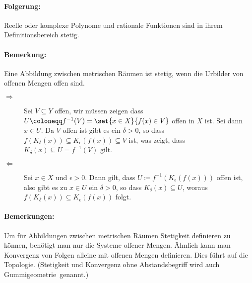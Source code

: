 \paragraph{Folgerung:}
Reelle oder komplexe Polynome und rationale Funktionen sind in ihrem Definitionsbereich stetig.
\paragraph{Bemerkung:}
Eine Abbildung zwischen metrischen Räumen ist stetig, wenn die Urbilder von offenen Mengen offen sind.
\beweis
\begin{description}
	\item[\glqq$\Rightarrow$\grqq] Sei $V\subseteq Y$ offen, wir müssen zeigen dass
	$U\coloneqq f^{-1}(V) =\set{x\in X}{f(x)\in V}$ offen in $X$ ist.
	Sei dann $x\in U$. Da $V$ offen ist gibt es ein $\delta>0$, so dass $f(K_\delta(x))\subseteq K_\epsilon(f(x))\subseteq V$ ist, was zeigt, dass $K_\delta(x)\subseteq U = f^{-1}(V)$ gilt.

	\item[\glqq$\Leftarrow$\grqq] Sei $x\in X$ und $\epsilon>0$. Dann gilt, dass $U\coloneqq f^{-1}(K_\epsilon(f(x)))$ offen ist, also gibt es zu $x\in U$ ein $\delta>0$, so dass $K_\delta(x)\subseteq U$, woraus $f(K_\delta(x))\subseteq K_\epsilon(f(x))$ folgt.
\end{description}
\paragraph{Bemerkungen:}
Um für Abbildungen zwischen metrischen Räumen Stetigkeit definieren zu können, benötigt man nur die Systeme offener Mengen. Ähnlich kann man Konvergenz von Folgen alleine mit offenen Mengen definieren. Dies führt auf die Topologie. (Stetigkeit und Konvergenz ohne Abstandsbegriff wird auch \glqq Gummigeometrie\grqq\  genannt.)

